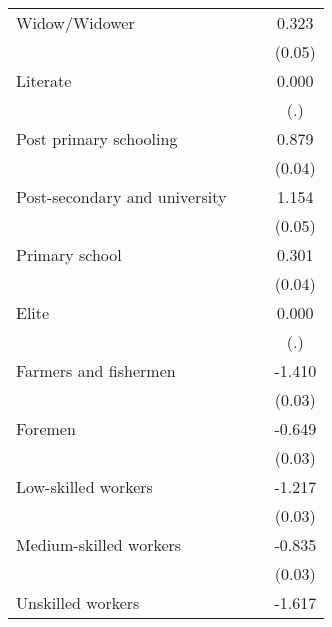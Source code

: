 {\begin{tabular}{l*{3}{c}}
Widow/Widower       &                     &                     &       0.323\sym{***}\\
                    &                     &                     &      (0.05)         \\
Literate            &                     &                     &       0.000         \\
                    &                     &                     &         (.)         \\
Post primary schooling&                     &                     &       0.879\sym{***}\\
                    &                     &                     &      (0.04)         \\
Post-secondary and university&                     &                     &       1.154\sym{***}\\
                    &                     &                     &      (0.05)         \\
Primary school      &                     &                     &       0.301\sym{***}\\
                    &                     &                     &      (0.04)         \\
Elite               &                     &                     &       0.000         \\
                    &                     &                     &         (.)         \\
Farmers and fishermen&                     &                     &      -1.410\sym{***}\\
                    &                     &                     &      (0.03)         \\
Foremen             &                     &                     &      -0.649\sym{***}\\
                    &                     &                     &      (0.03)         \\
Low-skilled workers &                     &                     &      -1.217\sym{***}\\
                    &                     &                     &      (0.03)         \\
Medium-skilled workers&                     &                     &      -0.835\sym{***}\\
                    &                     &                     &      (0.03)         \\
Unskilled workers   &                     &                     &      -1.617\sym{***}\\

\end{tabular}}
